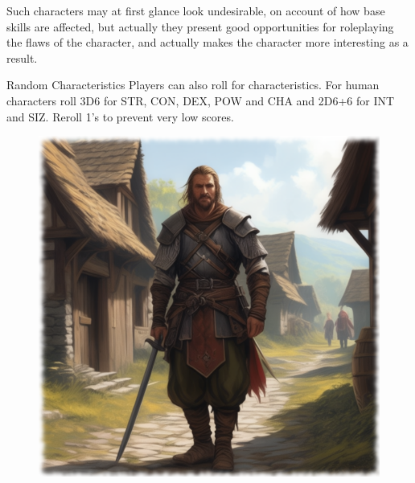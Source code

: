 Such characters may at first glance look undesirable, on account of how base skills are affected, but actually they present good opportunities for roleplaying the flaws of the character, and actually makes the character more interesting as a result.

\vspace{3mm}
\begin{rpg-titlebox}{Random Characteristics}
Players can also roll for characteristics. For human characters roll 3D6 for STR, CON, DEX, POW and CHA and 2D6+6 for INT and SIZ. Reroll 1's to prevent very low scores.
\end{rpg-titlebox}



\begin{figure}%
\begin{center}
  \includegraphics[scale=0.24]{img/ai-images/human-warrior.png}
\end{center}
\end{figure}

